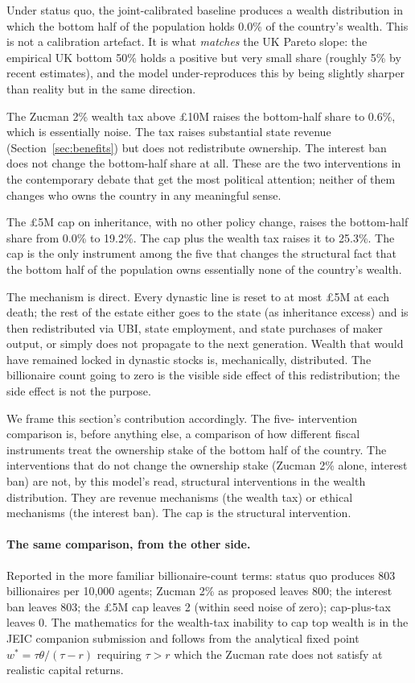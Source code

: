 \documentclass[11pt]{article}
\begin{document}
Under status quo, the joint-calibrated baseline produces a wealth
distribution in which the bottom half of the population holds 0.0\%
of the country's wealth.  This is not a calibration artefact.  It is
what \emph{matches} the UK Pareto slope: the empirical UK bottom
50\% holds a positive but very small share (roughly 5\% by recent
estimates), and the model under-reproduces this by being slightly
sharper than reality but in the same direction.

The Zucman 2\% wealth tax above \pounds 10M raises the bottom-half
share to 0.6\%, which is essentially noise.  The tax raises
substantial state revenue (Section~\ref{sec:benefits}) but does
not redistribute ownership.  The interest ban does not change the
bottom-half share at all.  These are the two interventions in the
contemporary debate that get the most political attention; neither
of them changes who owns the country in any meaningful sense.

The \pounds 5M cap on inheritance, with no other policy change,
raises the bottom-half share from 0.0\% to 19.2\%.  The cap plus
the wealth tax raises it to 25.3\%.  The cap is the only
instrument among the five that changes the structural fact that
the bottom half of the population owns essentially none of the
country's wealth.

The mechanism is direct.  Every dynastic line is reset to at most
\pounds 5M at each death; the rest of the estate either goes to
the state (as inheritance excess) and is then redistributed via
UBI, state employment, and state purchases of maker output, or
simply does not propagate to the next generation.  Wealth that
would have remained locked in dynastic stocks is, mechanically,
distributed.  The billionaire count going to zero is the visible
side effect of this redistribution; the side effect is not the
purpose.

We frame this section's contribution accordingly.  The five-
intervention comparison is, before anything else, a comparison of
how different fiscal instruments treat the ownership stake of the
bottom half of the country.  The interventions that do not change
the ownership stake (Zucman 2\% alone, interest ban) are not, by
this model's read, structural interventions in the wealth
distribution.  They are revenue mechanisms (the wealth tax) or
ethical mechanisms (the interest ban).  The cap is the structural
intervention.

\paragraph{The same comparison, from the other side.}  Reported
in the more familiar billionaire-count terms: status quo produces
803 billionaires per 10{,}000 agents; Zucman 2\% as proposed
leaves 800; the interest ban leaves 803; the \pounds 5M cap leaves
2 (within seed noise of zero); cap-plus-tax leaves 0.  The
mathematics for the wealth-tax inability to cap top wealth is in
the JEIC companion submission and follows from the analytical
fixed point $w^* = \tau \theta / (\tau - r)$ requiring $\tau > r$
which the Zucman rate does not satisfy at realistic capital
returns.
\end{document}
